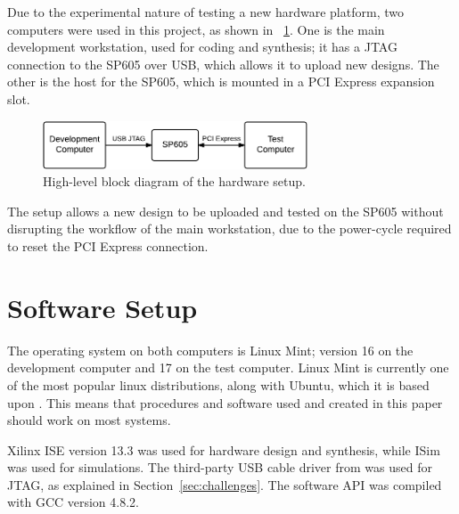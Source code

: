 Due to the experimental nature of testing a new hardware platform, two computers were used in this project, as shown in \figurename~\ref{fig:hardware-setup}.
One is the main development workstation, used for coding and synthesis; it has a JTAG connection to the SP605 over USB, which allows it to upload new designs.
The other is the host for the SP605, which is mounted in a PCI Express expansion slot.

\begin{figure}[!ht]
    \centering
    \includegraphics[width=0.70\textwidth]{figures/hardware-setup}
    \caption[Hardware setup]{
        High-level block diagram of the hardware setup.
    }
    \label{fig:hardware-setup}
\end{figure}

The setup allows a new design to be uploaded and tested on the SP605 without disrupting the workflow of the main workstation, due to the power-cycle required to reset the PCI Express connection.

\section{Software Setup}

The operating system on both computers is Linux Mint; version 16 on the development computer and 17 on the test computer.
Linux Mint is currently one of the most popular linux distributions, along with Ubuntu, which it is based upon \cite{distrowatch}.
This means that procedures and software used and created in this paper should work on most systems.

Xilinx ISE version 13.3 was used for hardware design and synthesis, while ISim was used for simulations.
The third-party USB cable driver from \cite{usbdriver} was used for JTAG, as explained in Section~\ref{sec:challenges}.
The software API was compiled with GCC version 4.8.2.

